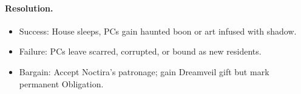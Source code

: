 \documentclass[11pt]{article}
\begin{document}
\paragraph{Resolution.}
\begin{itemize}
  \item Success: House sleeps, PCs gain haunted boon or art infused with shadow.
  \item Failure: PCs leave scarred, corrupted, or bound as new residents.
  \item Bargain: Accept Noctira’s patronage; gain Dreamveil gift but mark permanent Obligation.
\end{itemize}
\end{document}
